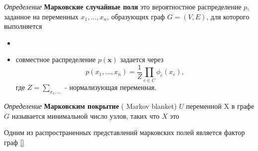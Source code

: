 \textit{Определение} \textbf{Марковские случайные поля} это
вероятностное распределение $p$, заданное на переменных $x_1, \dots,x_n$, образующих
граф $G=(V,E)$, для которого выполняется \begin{itemize}
    \item 
    \item  совместное распределение $p(\mathbf{x})$ задается через  \begin{equation}
        p(x_1, \dots, x_n) = \frac{1}{Z} \prod_{c \in C} \phi_c(x_c),
    \end{equation} где $Z = \sum_{x_1, \dots}$ - нормализующая переменная.
\end{itemize}

\textit{Определение} \textbf{Марковским покрытие} ( Markov blanket)  $U$ переменной X 
в графе $G$ называется минимальной число узлов, таких что $X$   
это
 
Одним из распространенных представлений марковских полей
является фактор граф \ref{}






